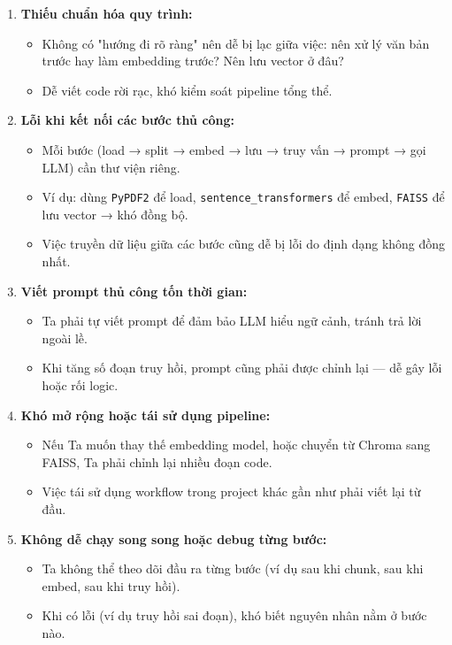 \documentclass[11pt]{article}
\begin{document}
\begin{enumerate}
    \item \textbf{Thiếu chuẩn hóa quy trình:}
    \begin{itemize}
        \item Không có "hướng đi rõ ràng" nên dễ bị lạc giữa việc: nên xử lý văn bản trước hay làm embedding trước? Nên lưu vector ở đâu?
        \item Dễ viết code rời rạc, khó kiểm soát pipeline tổng thể.
    \end{itemize}

    \item \textbf{Lỗi khi kết nối các bước thủ công:}
    \begin{itemize}
        \item Mỗi bước (load → split → embed → lưu → truy vấn → prompt → gọi LLM) cần thư viện riêng.
        \item Ví dụ: dùng \texttt{PyPDF2} để load, \texttt{sentence\_transformers} để embed, \texttt{FAISS} để lưu vector → khó đồng bộ.
        \item Việc truyền dữ liệu giữa các bước cũng dễ bị lỗi do định dạng không đồng nhất.
    \end{itemize}

    \item \textbf{Viết prompt thủ công tốn thời gian:}
    \begin{itemize}
        \item Ta phải tự viết prompt để đảm bảo LLM hiểu ngữ cảnh, tránh trả lời ngoài lề.
        \item Khi tăng số đoạn truy hồi, prompt cũng phải được chỉnh lại — dễ gây lỗi hoặc rối logic.
    \end{itemize}

    \item \textbf{Khó mở rộng hoặc tái sử dụng pipeline:}
    \begin{itemize}
        \item Nếu Ta muốn thay thế embedding model, hoặc chuyển từ Chroma sang FAISS, Ta phải chỉnh lại nhiều đoạn code.
        \item Việc tái sử dụng workflow trong project khác gần như phải viết lại từ đầu.
    \end{itemize}

    \item \textbf{Không dễ chạy song song hoặc debug từng bước:}
    \begin{itemize}
        \item Ta không thể theo dõi đầu ra từng bước (ví dụ sau khi chunk, sau khi embed, sau khi truy hồi).
        \item Khi có lỗi (ví dụ truy hồi sai đoạn), khó biết nguyên nhân nằm ở bước nào.
    \end{itemize}
\end{enumerate}
\end{document}
